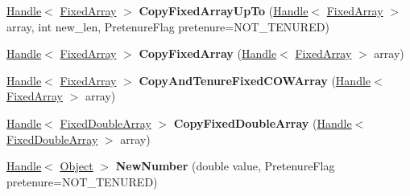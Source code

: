 \begin{DoxyCompactItemize}
\item 
\hyperlink{classv8_1_1internal_1_1_handle}{Handle}$<$ \hyperlink{classv8_1_1internal_1_1_fixed_array}{Fixed\+Array} $>$ {\bfseries Copy\+Fixed\+Array\+Up\+To} (\hyperlink{classv8_1_1internal_1_1_handle}{Handle}$<$ \hyperlink{classv8_1_1internal_1_1_fixed_array}{Fixed\+Array} $>$ array, int new\+\_\+len, Pretenure\+Flag pretenure=N\+O\+T\+\_\+\+T\+E\+N\+U\+R\+ED)\hypertarget{classv8_1_1internal_1_1_factory_a8dbd608f82a5d4175391c530dc8a9196}{}\label{classv8_1_1internal_1_1_factory_a8dbd608f82a5d4175391c530dc8a9196}

\item 
\hyperlink{classv8_1_1internal_1_1_handle}{Handle}$<$ \hyperlink{classv8_1_1internal_1_1_fixed_array}{Fixed\+Array} $>$ {\bfseries Copy\+Fixed\+Array} (\hyperlink{classv8_1_1internal_1_1_handle}{Handle}$<$ \hyperlink{classv8_1_1internal_1_1_fixed_array}{Fixed\+Array} $>$ array)\hypertarget{classv8_1_1internal_1_1_factory_a05d1e0e5e666425c40f1f5c82194b648}{}\label{classv8_1_1internal_1_1_factory_a05d1e0e5e666425c40f1f5c82194b648}

\item 
\hyperlink{classv8_1_1internal_1_1_handle}{Handle}$<$ \hyperlink{classv8_1_1internal_1_1_fixed_array}{Fixed\+Array} $>$ {\bfseries Copy\+And\+Tenure\+Fixed\+C\+O\+W\+Array} (\hyperlink{classv8_1_1internal_1_1_handle}{Handle}$<$ \hyperlink{classv8_1_1internal_1_1_fixed_array}{Fixed\+Array} $>$ array)\hypertarget{classv8_1_1internal_1_1_factory_a025ec998267765e7806ba3bcb90ad1d5}{}\label{classv8_1_1internal_1_1_factory_a025ec998267765e7806ba3bcb90ad1d5}

\item 
\hyperlink{classv8_1_1internal_1_1_handle}{Handle}$<$ \hyperlink{classv8_1_1internal_1_1_fixed_double_array}{Fixed\+Double\+Array} $>$ {\bfseries Copy\+Fixed\+Double\+Array} (\hyperlink{classv8_1_1internal_1_1_handle}{Handle}$<$ \hyperlink{classv8_1_1internal_1_1_fixed_double_array}{Fixed\+Double\+Array} $>$ array)\hypertarget{classv8_1_1internal_1_1_factory_a4cdff7683e9549a6e4ac2666ec0aeca8}{}\label{classv8_1_1internal_1_1_factory_a4cdff7683e9549a6e4ac2666ec0aeca8}

\item 
\hyperlink{classv8_1_1internal_1_1_handle}{Handle}$<$ \hyperlink{classv8_1_1internal_1_1_object}{Object} $>$ {\bfseries New\+Number} (double value, Pretenure\+Flag pretenure=N\+O\+T\+\_\+\+T\+E\+N\+U\+R\+ED)\hypertarget{classv8_1_1internal_1_1_factory_a21eb17d608263deab6022a270243e070}{}\label{classv8_1_1internal_1_1_factory_a21eb17d608263deab6022a270243e070}


\end{DoxyCompactItemize}
